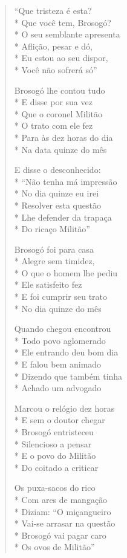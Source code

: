\begin{verse}
``Que tristeza é esta?\\*
Que você tem, Brosogó?\\*
O seu semblante apresenta\\*
Aflição, pesar e dó,\\*
Eu estou ao seu dispor,\\*
Você não sofrerá só''

Brosogó lhe contou tudo\\*
E disse por sua vez\\*
Que o coronel Militão\\*
O trato com ele fez\\*
Para às dez horas do dia\\*
Na data quinze do mês

E disse o desconhecido:\\*
``Não tenha má impressão\\*
No dia quinze eu irei\\*
Resolver esta questão\\*
Lhe defender da trapaça\\*
Do ricaço Militão''

Brosogó foi para casa\\*
Alegre sem timidez,\\*
O que o homem lhe pediu\\*
Ele satisfeito fez\\*
E foi cumprir seu trato\\*
No dia quinze do mês

Quando chegou encontrou\\*
Todo povo aglomerado\\*
Ele entrando deu bom dia\\*
E falou bem animado\\*
Dizendo que também tinha\\*
Achado um advogado

Marcou o relógio dez horas\\*
E sem o doutor chegar\\*
Brosogó entristeceu\\*
Silencioso a pensar\\*
E o povo do Militão\\*
Do coitado a criticar

Os puxa-sacos do rico\\*
Com ares de mangação\\*
Diziam: ``O miçangueiro\\*
Vai-se arrasar na questão\\*
Brosogó vai pagar caro\\*
Os ovos de Militão''


\end{verse}
